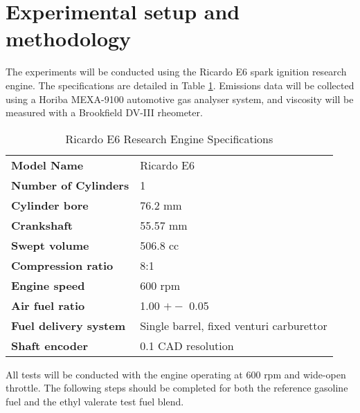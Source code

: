 \section{Experimental setup and methodology}
The experiments will be conducted using the Ricardo E6 spark ignition research engine. The specifications are detailed in Table \ref{intro-1}. Emissions data will be collected using a Horiba MEXA-9100 automotive gas analyser system, and viscosity will be measured with a Brookfield DV-III rheometer.
\begin{table}[H]
    \begin{center}
        \begin{tabular}{@{}l l@{}}
            \toprule
            \textbf{Model Name}           & Ricardo E6                               \\
            \textbf{Number of Cylinders}  & 1                                        \\
            \textbf{Cylinder bore}        & 76.2 mm                                  \\
            \textbf{Crankshaft}           & 55.57 mm                                 \\
            \textbf{Swept volume}         & 506.8 cc                                 \\
            \textbf{Compression ratio}    & 8:1                                      \\
            \textbf{Engine speed}         & 600 rpm                                  \\
            \textbf{Air fuel ratio}       & 1.00 $+-$ 0.05                           \\
            \textbf{Fuel delivery system} & Single barrel, fixed venturi carburettor \\
            \textbf{Shaft encoder}        & 0.1 CAD resolution                       \\
            \bottomrule
        \end{tabular}
        \caption{Ricardo E6 Research Engine Specifications}
        \label{intro-1}
    \end{center}
\end{table}
All tests will be conducted with the engine operating at 600 rpm and wide-open throttle. The following steps should be completed for both the reference gasoline fuel and the ethyl valerate test fuel blend.
